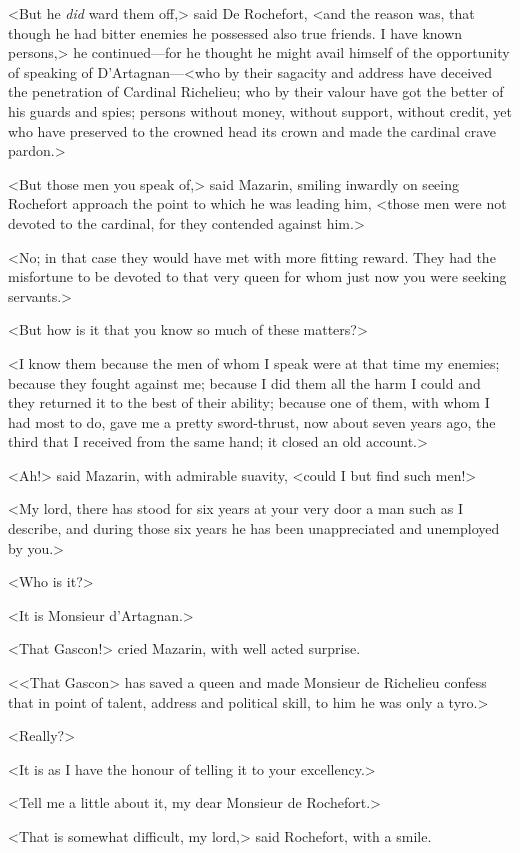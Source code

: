 <But he \emph{did} ward them off,> said De Rochefort, <and the reason was, that though he had bitter enemies he possessed also true friends. I have known persons,> he continued—for he thought he might avail himself of the opportunity of speaking of D'Artagnan—<who by their sagacity and address have deceived the penetration of Cardinal Richelieu; who by their valour have got the better of his guards and spies; persons without money, without support, without credit, yet who have preserved to the crowned head its crown and made the cardinal crave pardon.>

<But those men you speak of,> said Mazarin, smiling inwardly on seeing Rochefort approach the point to which he was leading him, <those men were not devoted to the cardinal, for they contended against him.>

<No; in that case they would have met with more fitting reward. They had the misfortune to be devoted to that very queen for whom just now you were seeking servants.>

<But how is it that you know so much of these matters?>

<I know them because the men of whom I speak were at that time my enemies; because they fought against me; because I did them all the harm I could and they returned it to the best of their ability; because one of them, with whom I had most to do, gave me a pretty sword-thrust, now about seven years ago, the third that I received from the same hand; it closed an old account.>

<Ah!> said Mazarin, with admirable suavity, <could I but find such men!>

<My lord, there has stood for six years at your very door a man such as I describe, and during those six years he has been unappreciated and unemployed by you.>

<Who is it?>

<It is Monsieur d'Artagnan.>

<That Gascon!> cried Mazarin, with well acted surprise.

<<That Gascon> has saved a queen and made Monsieur de Richelieu confess that in point of talent, address and political skill, to him he was only a tyro.>

<Really?>

<It is as I have the honour of telling it to your excellency.>

<Tell me a little about it, my dear Monsieur de Rochefort.>

<That is somewhat difficult, my lord,> said Rochefort, with a smile.

